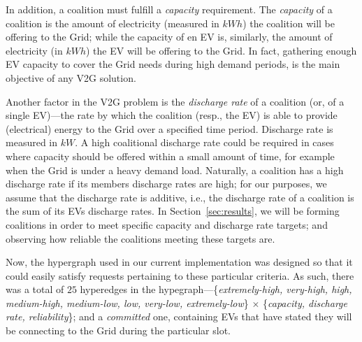 
In addition, a coalition must fulfill a {\em capacity} requirement. 
The {\em capacity} of a coalition is the amount of electricity (measured in $kWh$) the coalition will be offering to the Grid; 
while the capacity of en EV is, similarly, the amount of electricity (in $kWh$) the EV will be offering to the Grid.
In fact, gathering enough EV capacity to cover the Grid needs during high demand periods, is the main objective of any V2G solution. 

Another factor in the V2G problem is the {\em discharge rate} of a coalition (or, of a single EV)---the rate by which the coalition (resp., the EV) is able to provide (electrical) energy to the Grid over a specified time period. Discharge rate is measured in $kW.$ %
A high coalitional discharge rate could be required in cases where capacity should be offered within a small amount of time, for example when the Grid is under a heavy demand load. 
Naturally, a coalition has a high discharge rate if its members discharge rates are high; for our purposes, we assume that the discharge rate is additive, i.e., the discharge rate of a coalition is the sum of its EVs discharge rates.
In Section~\ref{sec:results}, we will be forming coalitions in order to meet specific capacity and discharge rate targets; and observing how reliable the coalitions meeting these targets are.

Now, the hypergraph used in our current implementation was designed so that it could easily satisfy requests pertaining to these particular criteria.
As such, there was a total of $25$ hyperedges in the hypegraph---\{{\em extremely-high, very-high, high, medium-high, medium-low, low, very-low, extremely-low}\} $\times$ \{{\em capacity, discharge rate, reliability}\}; and a {\em committed} one, containing EVs that have stated they will be connecting to the Grid during the particular slot.%

